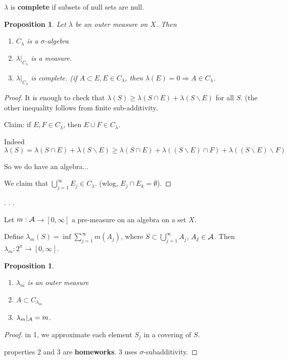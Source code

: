 \documentclass[11pt]{article}
\newtheorem{prop}[thm]{Proposition}
\newenvironment{defn}[1][Definition]{\begin{trivlist}
\item[\hskip \labelsep {\bfseries #1}]}{\end{trivlist}}
\newcommand{\ra}{\rightarrow}
\newcommand{\Ra}{\Rightarrow}
\newcommand{\sbs}{\subset}
\newcommand{\bs}{\backslash}
\newcommand{\es}{\emptyset}
\newcommand{\si}{\sigma}
\newcommand{\la}{\lambda}
\newcommand{\su}[2]{\sum_{#1}^{#2}}
\newcommand{\bcu}[2]{\bigcup_{#1}^{#2}}
\begin{document}
\begin{defn}
$\la$ is {\bf complete} if subsets of null sets are null.
\end{defn}

\begin{prop}
Let $\la$ be an outer measure on $X$. Then 
\begin{enumerate}
\item[(i)] $C_{\la}$ is a $\si$-algebra
\item[(ii)] $\la|_{C_{\la}}$ is a measure. 
\item[(iii)] $\la|_{C_{\la}}$ is complete. (if $A\sbs E, E\in C_{\la}$, then $\la(E)=0\Ra A\in C_{\la}$. 
\end{enumerate}

\end{prop}
\begin{proof}
It is enough to check that $\la(S)\ge \la(S\cap E)+\la(S\bs E)$ for all $S$. (the other inequality follows from finite sub-additivity. 

Claim: if $E,F\in C_{\la}$, then $E\cup F\in C_{\la}$. 

Indeed 
\[\la(S)=\la(S\cap E)+\la(S\bs E)\ge\la(S\cap E)+\la((S\bs E)\cap F)+\la((S\bs E)\bs F)\]

So we do have an algebra...

We claim that $\bcu{j=1}{\infty} E_j\in C_{\la}$. (wlog, $E_j\cap E_k=\es$).

\end{proof}

. . . 

Let $m:\cal{A}$$\ra[0,\infty]$ a pre-measure on an algebra on a set $X$. 

\begin{defn}
Define $\la_m(S)=\inf\su{j=1}{\infty}m(A_j)$, where $S\sbs\bcu{j=1}{\infty}A_j$, $A_j\in\cal{A}$. Then $\la_m:2^x\ra[0,\infty]$.
\end{defn}

\begin{prop}
\begin{enumerate}
\item $\la_m$ is an outer measure
\item $A\sbs C_{\la_m}$
\item $\la_m|_{\cal{A}}=m$. 
\end{enumerate}
\end{prop}

\begin{proof}
in 1, we approximate each element $S_j$ in a covering of $S$. 

properties 2 and 3 are {\bf homeworks}. 3 uses $\si$-subadditivity. 

\end{proof}
\end{document}
